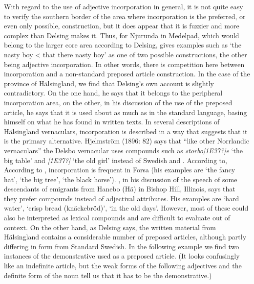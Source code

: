 With regard to the use of adjective incorporation in general, it is not quite easy to verify the southern border of the area where incorporation is the preferred, or even only possible, construction, but it does appear that it is fuzzier and more complex than Delsing makes it. Thus, for Njurunda in Medelpad, which would belong to the larger core area according to Delsing, \citet[59]{Stenbom1916} gives examples such as  ‘the nasty boy {\textless} that there nasty boy’ as one of two possible constructions, the other being adjective incorporation. In other words, there is competition here between incorporation and a non-standard preposed article construction. In the case of the province of Hälsingland, we find that Delsing’s own account is slightly contradictory. On the one hand, he says that it belongs to the peripheral incorporation area, on the other, in his discussion of the use of the preposed article, he says that it is used about as much as in the standard language, basing himself on what he has found in written texts. In several descriptions of Hälsingland vernaculars, incorporation is described in a way that suggests that it is the primary alternative. Hjelmström (1896: 82) says that “like other Norrlandic vernaculars” the Delsbo vernacular uses compounds such as \textit{storbo[1E37?]e} ‘the big table’ and \textit{[1E37?]} ‘the old girl’ instead of Swedish  and . According to, According to \citet[31]{Franck1995}, incorporation is frequent in Forsa (his examples are ‘the fancy hat’, ‘the big tree’,  ‘the black horse’). \citet[62]{Hedblom1978}, in his discussion of the speech of some descendants of emigrants from Hanebo (Hä) in Bishop Hill, Illinois, says that they prefer compounds instead of adjectival attributes. His examples are  ‘hard water’,  ‘crisp bread (knäckebröd)’,  ‘in the old days’. However, most of these could also be interpreted as lexical compounds and are difficult to evaluate out of context. On the other hand, as Delsing says, the written material from Hälsingland contains a considerable number of preposed articles, although partly differing in form from Standard Swedish. In the following example we find two instances of the demonstrative  used as a preposed article. (It looks confusingly like an indefinite article, but the weak forms of the following adjectives and the definite form of the noun tell us that it has to be the demonstrative.) 

